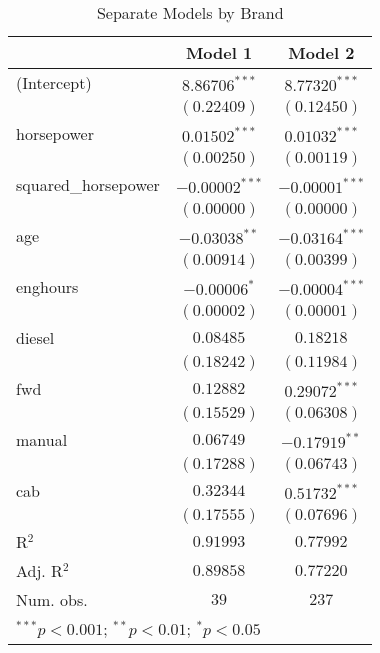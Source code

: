 
\begin{table}
\begin{center}
\begin{tabular}{l c c}
\hline
 & Model 1 & Model 2 \\
\hline
(Intercept)         & $8.86706^{***}$  & $8.77320^{***}$  \\
                    & $(0.22409)$      & $(0.12450)$      \\
horsepower          & $0.01502^{***}$  & $0.01032^{***}$  \\
                    & $(0.00250)$      & $(0.00119)$      \\
squared\_horsepower & $-0.00002^{***}$ & $-0.00001^{***}$ \\
                    & $(0.00000)$      & $(0.00000)$      \\
age                 & $-0.03038^{**}$  & $-0.03164^{***}$ \\
                    & $(0.00914)$      & $(0.00399)$      \\
enghours            & $-0.00006^{*}$   & $-0.00004^{***}$ \\
                    & $(0.00002)$      & $(0.00001)$      \\
diesel              & $0.08485$        & $0.18218$        \\
                    & $(0.18242)$      & $(0.11984)$      \\
fwd                 & $0.12882$        & $0.29072^{***}$  \\
                    & $(0.15529)$      & $(0.06308)$      \\
manual              & $0.06749$        & $-0.17919^{**}$  \\
                    & $(0.17288)$      & $(0.06743)$      \\
cab                 & $0.32344$        & $0.51732^{***}$  \\
                    & $(0.17555)$      & $(0.07696)$      \\
\hline
R$^2$               & $0.91993$        & $0.77992$        \\
Adj. R$^2$          & $0.89858$        & $0.77220$        \\
Num. obs.           & $39$             & $237$            \\
\hline
\multicolumn{3}{l}{\scriptsize{$^{***}p<0.001$; $^{**}p<0.01$; $^{*}p<0.05$}}
\end{tabular}
\caption{Separate Models by Brand}
\label{tab:reg_johndeere}
\end{center}
\end{table}
